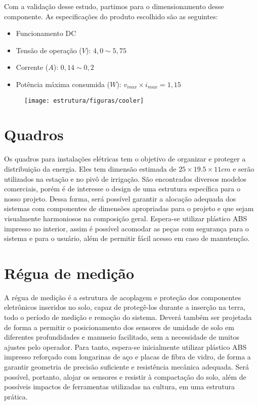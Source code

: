 	Com a validação desse estudo, partimos para o dimensionamento desse componente. As especificações do produto escolhido são as seguintes: 
	\begin{itemize}
	\item Funcionamento DC
	\item Tensão de operação ($V$): $4,0 \sim 5,75$ 
	\item Corrente ($A$): $0,14 \sim 0,2$
	\item Potência máxima consumida ($W$): $v_{max} \times i_{max} = 1,15$ 
	\end{itemize}

 \begin{figure}[H]
	\centering
\texttt{[image: estrutura/figuras/cooler]}
	\label{fig3} 
	\end{figure}
	
	
 	\section{Quadros}
	
	Os quadros para instalações elétricas tem o objetivo de organizar e proteger a distribuição da energia. Eles tem dimensão estimada de $25 \times 19.5 \times 11 cm $ e serão utilizados na estação e no pivô de irrigação.
	São encontrados diversos modelos comerciais, porém é de interesse o design de uma estrutura específica para o nosso projeto. Dessa forma, será possível garantir a alocação adequada dos sistemas com componentes de dimensões apropriadas para o projeto e que sejam visualmente harmoniosos na composição geral. Espera-se utilizar plástico ABS impresso no interior, assim é possível acomodar as peças com segurança para o sistema e para o usuário, além de permitir fácil acesso em caso de manutenção.

	
	\section{Régua de medição}
	
	A régua de medição é a estrutura de acoplagem e proteção dos componentes eletrônicos inseridos no solo, capaz de protegê-los durante a inserção na terra, todo o período de medição e remoção do sistema. Deverá também ser projetada de forma a permitir o posicionamento dos sensores de umidade de solo em diferentes profundidades e manuseio facilitado, sem a necessidade de muitos ajustes pelo operador. Para tanto, espera-se inicialmente utilizar plástico ABS impresso reforçado com longarinas de aço e placas de fibra de vidro, de forma a garantir geometria de precisão suficiente e resistência mecânica adequada. Será possível, portanto, alojar os sensores e resistir à compactação do solo, além de possíveis impactos de ferramentas utilizadas na cultura, em uma estrutura prática. 
	
